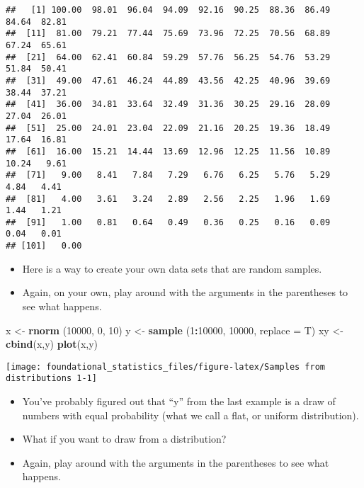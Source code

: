\documentclass[]{book}
\newenvironment{Shaded}{\begin{snugshade}}{\end{snugshade}}
\newcommand{\DataTypeTok}[1]{\textcolor[rgb]{0.13,0.29,0.53}{#1}}
\newcommand{\DecValTok}[1]{\textcolor[rgb]{0.00,0.00,0.81}{#1}}
\newcommand{\KeywordTok}[1]{\textcolor[rgb]{0.13,0.29,0.53}{\textbf{#1}}}
\newcommand{\NormalTok}[1]{#1}
\newcommand{\OperatorTok}[1]{\textcolor[rgb]{0.81,0.36,0.00}{\textbf{#1}}}
\newcommand{\StringTok}[1]{\textcolor[rgb]{0.31,0.60,0.02}{#1}}
\begin{document}
\begin{verbatim}
##   [1] 100.00  98.01  96.04  94.09  92.16  90.25  88.36  86.49  84.64  82.81
##  [11]  81.00  79.21  77.44  75.69  73.96  72.25  70.56  68.89  67.24  65.61
##  [21]  64.00  62.41  60.84  59.29  57.76  56.25  54.76  53.29  51.84  50.41
##  [31]  49.00  47.61  46.24  44.89  43.56  42.25  40.96  39.69  38.44  37.21
##  [41]  36.00  34.81  33.64  32.49  31.36  30.25  29.16  28.09  27.04  26.01
##  [51]  25.00  24.01  23.04  22.09  21.16  20.25  19.36  18.49  17.64  16.81
##  [61]  16.00  15.21  14.44  13.69  12.96  12.25  11.56  10.89  10.24   9.61
##  [71]   9.00   8.41   7.84   7.29   6.76   6.25   5.76   5.29   4.84   4.41
##  [81]   4.00   3.61   3.24   2.89   2.56   2.25   1.96   1.69   1.44   1.21
##  [91]   1.00   0.81   0.64   0.49   0.36   0.25   0.16   0.09   0.04   0.01
## [101]   0.00
\end{verbatim}

\begin{itemize}
\item
  Here is a way to create your own data sets that are random samples.
\item
  Again, on your own, play around with the arguments in the parentheses to see what happens.
\end{itemize}

\begin{Shaded}
\begin{Highlighting}[]
\NormalTok{x <-}\StringTok{ }\KeywordTok{rnorm}\NormalTok{ (}\DecValTok{10000}\NormalTok{, }\DecValTok{0}\NormalTok{, }\DecValTok{10}\NormalTok{)}
\NormalTok{y <-}\StringTok{ }\KeywordTok{sample}\NormalTok{ (}\DecValTok{1}\OperatorTok{:}\DecValTok{10000}\NormalTok{, }\DecValTok{10000}\NormalTok{, }\DataTypeTok{replace =}\NormalTok{ T)}
\NormalTok{xy <-}\StringTok{ }\KeywordTok{cbind}\NormalTok{(x,y)}
\KeywordTok{plot}\NormalTok{(x,y) }
\end{Highlighting}
\end{Shaded}

\texttt{[image: foundational\_statistics\_files/figure-latex/Samples from distributions 1-1]}

\begin{itemize}
\item
  You've probably figured out that ``y'' from the last example is a draw of numbers with equal probability (what we call a flat, or uniform distribution).
\item
  What if you want to draw from a distribution?
\item
  Again, play around with the arguments in the parentheses to see what happens.
\end{itemize}
\end{document}
